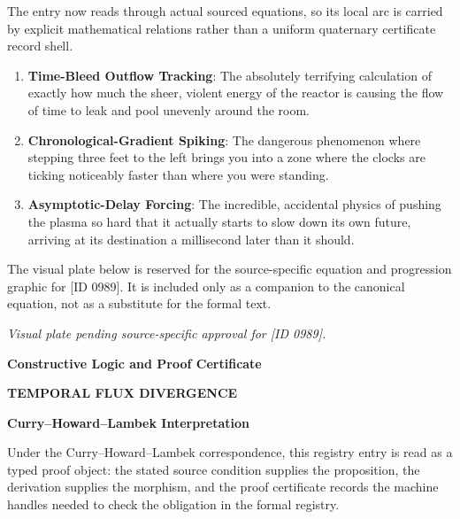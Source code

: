 The entry now reads through actual sourced equations, so its local arc is carried by explicit mathematical relations rather than a uniform quaternary certificate record shell.
\endgroup

\begin{enumerate}[leftmargin=1.6em,itemsep=6pt,topsep=4pt]
\item \textbf{Time-Bleed Outflow Tracking}: The absolutely terrifying calculation of exactly how much the sheer, violent energy of the reactor is causing the flow of time to leak and pool unevenly around the room.
\item \textbf{Chronological-Gradient Spiking}: The dangerous phenomenon where stepping three feet to the left brings you into a zone where the clocks are ticking noticeably faster than where you were standing.
\item \textbf{Asymptotic-Delay Forcing}: The incredible, accidental physics of pushing the plasma so hard that it actually starts to slow down its own future, arriving at its destination a millisecond later than it should.
\end{enumerate}

\begingroup\footnotesize\sloppy
The visual plate below is reserved for the source-specific equation and progression graphic for [ID 0989]. It is included only as a companion to the canonical equation, not as a substitute for the formal text.
\par\endgroup
\begingroup\footnotesize\itshape
Visual plate pending source-specific approval for [ID 0989].
\par\endgroup

\clearpage
\begingroup\tzpsupportsetup
\noindent\textbf{\fontsize{10.8pt}{12.8pt}\selectfont [ID 0989] Constructive Logic and Proof Certificate}\par
\noindent\textbf{\fontsize{10pt}{12pt}\selectfont TEMPORAL FLUX DIVERGENCE}\par
\vspace{0.45em}
\begingroup
\footnotesize
\setlength{\parskip}{0.22em}
\setlength{\parindent}{0pt}
\noindent\textbf{Curry--Howard--Lambek Interpretation}\par
Under the Curry--Howard--Lambek correspondence, this registry entry is read as a typed proof
object: the stated source condition supplies the proposition, the derivation supplies the
morphism, and the proof certificate records the machine handles needed to check the obligation
in the formal registry.

